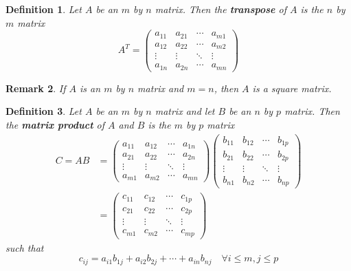 \documentclass[12pt]{book}
\theoremstyle{definitionstyle}
\newtheorem{definition}{Definition}[section]
\newtheorem{remark}[definition]{Remark}
\numberwithin{equation}{section}
\begin{document}
\begin{definition}
	Let $A$ be an $m$ by $n$ matrix. Then the \textbf{transpose} of $A$ is the $n$ by $m$ matrix
	\begin{equation}
	A^T = \begin{pmatrix} a_{11} & a_{21} & \cdots & a_{m1} \\ a_{12} & a_{22} & \cdots & a_{m2} \\ \vdots & \vdots & \ddots & \vdots \\ a_{1n} & a_{2n} & \cdots & a_{mn} \end{pmatrix}
	\end{equation}	
\end{definition}

\vspace{0.5cm}

\begin{remark}
    If $A$ is an $m$ by $n$ matrix and $m = n$, then $A$ is a square matrix.
\end{remark}

\begin{definition}
	Let $A$ be an $m$ by $n$ matrix and let $B$ be an $n$ by $p$ matrix. Then the \textbf{matrix product} of $A$ and $B$ is the $m$ by $p$ matrix
	\begin{equation}
	    \begin{split}
		C = AB & = \begin{pmatrix} a_{11} & a_{12} & \cdots & a_{1n} \\ a_{21} & a_{22} & \cdots & a_{2n} \\ \vdots & \vdots & \ddots & \vdots \\ a_{m1} & a_{m2} & \cdots & a_{mn} \end{pmatrix} \begin{pmatrix} b_{11} & b_{12} & \cdots & b_{1p} \\ b_{21} & b_{22} & \cdots & b_{2p} \\ \vdots & \vdots & \ddots & \vdots \\ b_{n1} & b_{n2} & \cdots & b_{np} \end{pmatrix} \\ 
		       & = \begin{pmatrix} c_{11} & c_{12} & \cdots & c_{1p} \\ c_{21} & c_{22} & \cdots & c_{2p} \\ \vdots & \vdots & \ddots & \vdots \\ c_{m1} & c_{m2} & \cdots & c_{mp} \end{pmatrix} 
	    \end{split}
	\end{equation}
	such that
	\begin{equation}
	    c_{ij} = a_{i1} b_{1j} + a_{i2} b_{2j} + \cdots + a_{in} b_{nj} \quad \forall i \leq m, j \leq p
	\end{equation}
\end{definition}
\end{document}
